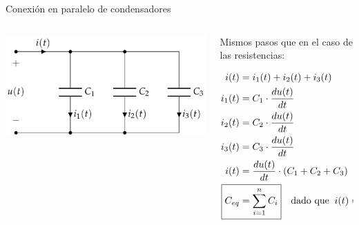 \documentclass[aspectratio=169, xcolor={usenames,svgnames,dvipsnames}]{beamer}
\begin{document}
\begin{frame}{Conexión en paralelo de condensadores} \label{diapo:condensadores_paralelo}
    \begin{columns}
    \begin{column}{0.4\columnwidth}
        \vspace{-10mm}
        \begin{center}
        \includegraphics[width=1.05\linewidth]{../figs/CondensadoresParalelo.pdf}
        \end{center}
    \end{column}
    \begin{column}{0.6\columnwidth}
    
    \vspace{2mm}
    Mismos pasos que en el caso de las resistencias:

    \vspace{-5mm}
    \begin{align*}
      i(t) & = i_1(t) + i_2(t) + i_3(t)\\
      i_1(t) &= C_1 \cdot \frac{du(t)}{dt}\\
      i_2(t) &= C_2 \cdot \frac{du(t)}{dt}\\
      i_3(t) &= C_3 \cdot \frac{du(t)}{dt}\\
      i(t)& = \frac{du(t)}{dt} \cdot (C_1 + C_2 + C_3)\\
      \Aboxed{C_{eq} &= \sum_{i = 1}^n C_i} \quad \textrm{dado que} \;\; i(t) = C_{eq} \cdot \frac{du(t)}{dt}
    \end{align*}
    \end{column}
    \end{columns}      
\end{frame}

\end{document}
